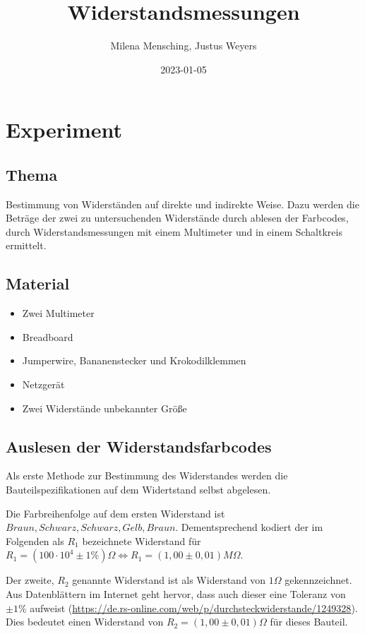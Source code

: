 \documentclass[
  9pt,
]{article}
\title{Widerstandsmessungen}
\author{Milena Mensching, Justus Weyers}
\date{2023-01-05}
\begin{document}
\maketitle

\hypertarget{experiment}{%
\section{Experiment}\label{experiment}}

\hypertarget{thema}{%
\subsection{Thema}\label{thema}}

Bestimmung von Widerständen auf direkte und indirekte Weise. Dazu werden
die Beträge der zwei zu untersuchenden Widerstände durch ablesen der
Farbcodes, durch Widerstandsmessungen mit einem Multimeter und in einem
Schaltkreis ermittelt.

\hypertarget{material}{%
\subsection{Material}\label{material}}

\begin{itemize}
\item{Zwei Multimeter}
\item{Breadboard}
\item{Jumperwire, Bananenstecker und Krokodilklemmen}
\item{Netzgerät}
\item{Zwei Widerstände unbekannter Größe}
\end{itemize}

\hypertarget{auslesen-der-widerstandsfarbcodes}{%
\subsection{Auslesen der
Widerstandsfarbcodes}\label{auslesen-der-widerstandsfarbcodes}}

Als erste Methode zur Bestimmung des Widerstandes werden die
Bauteilspezifikationen auf dem Widertstand selbst abgelesen.

Die Farbreihenfolge auf dem ersten Widerstand ist
\(Braun, Schwarz, Schwarz, Gelb, Braun\). Dementsprechend kodiert der im
Folgenden als \(R_1\) bezeichnete Widerstand für
\(R_1 = (100 \cdot 10^4\pm 1\% ) \Omega \Leftrightarrow R_1=(1,00\pm 0,01) M\Omega\).

Der zweite, \(R_2\) genannte Widerstand ist als Widerstand von
\(1\Omega\) gekennzeichnet. Aus Datenblättern im Internet geht hervor,
dass auch dieser eine Toleranz von \(\pm 1 \%\) aufweist
(\url{https://de.rs-online.com/web/p/durchsteckwiderstande/1249328}).
Dies bedeutet einen Widerstand von \(R_2=(1,00 \pm 0,01)\Omega\) für
dieses Bauteil.
\end{document}
